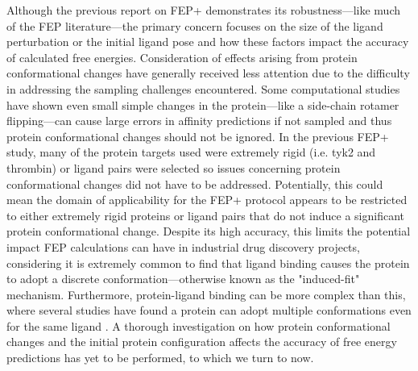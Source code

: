\documentclass[journal=jctcce,manuscript=article]{achemso}
\begin{document}
Although the previous report on FEP+\cite{FEPplus} demonstrates its robustness---like much of the FEP literature---the primary concern focuses on the size of the ligand perturbation or the initial ligand pose and how these factors impact the accuracy of calculated free energies.\cite{mobley2012perspective,doi:10.1021/acs.jctc.5b00214}
Consideration of effects arising from protein conformational changes have generally received less attention due to the difficulty in addressing the sampling challenges encountered.
Some computational studies have shown even small simple changes in the protein---like a side-chain rotamer flipping---can cause large errors in affinity predictions if not sampled\cite{Mobley2009489,Mobley20071118} and thus protein conformational changes should not be ignored.
In the previous FEP+ study\cite{FEPplus}, many of the protein targets used were extremely rigid (i.e. tyk2 and thrombin) or ligand pairs were selected so issues concerning protein conformational changes did not have to be addressed.
Potentially, this could mean the domain of applicability for the FEP+ protocol appears to be restricted to either extremely rigid proteins or ligand pairs that do not induce a significant protein conformational change.
Despite its high accuracy, this limits the potential impact FEP calculations can have in industrial drug discovery projects, considering it is extremely common to find that ligand binding causes the protein to adopt a discrete conformation---otherwise known as the "induced-fit" mechanism.
Furthermore, protein-ligand binding can be more complex than this, where several studies have found a protein can adopt multiple conformations even for the same ligand \cite{doi:10.1021/jm060167o,Gutteridge200521,Merski2015}.
A thorough investigation on how protein conformational changes and the initial protein configuration affects the accuracy of free energy predictions has yet to be performed, to which we turn to now.
\end{document}
